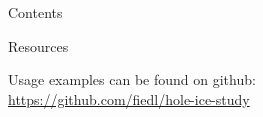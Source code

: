 \begin{frame}{Contents}
  \tableofcontents
\end{frame}

\begin{frame}{Resources}
  \begin{center}
    Usage examples can be found on github: \\ \vspace{0.3cm}
    \url{https://github.com/fiedl/hole-ice-study}
  \end{center}
\end{frame}
